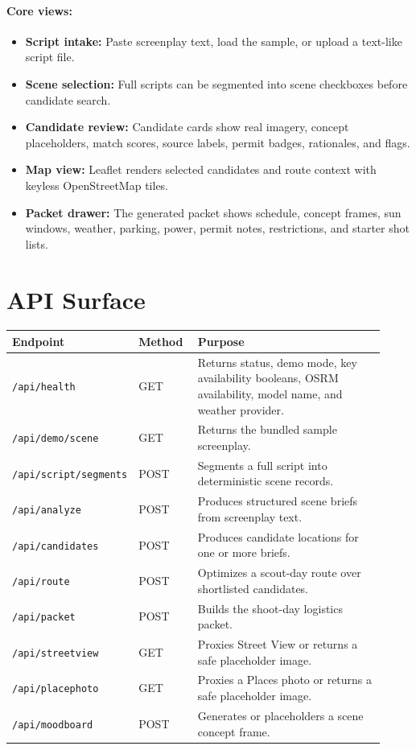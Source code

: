 \documentclass[11pt]{article}
\begin{document}
\paragraph{Core views:}
\begin{itemize}[leftmargin=*]
  \item \textbf{Script intake:} Paste screenplay text, load the sample, or upload
  a text-like script file.
  \item \textbf{Scene selection:} Full scripts can be segmented into scene
  checkboxes before candidate search.
  \item \textbf{Candidate review:} Candidate cards show real imagery, concept
  placeholders, match scores, source labels, permit badges, rationales, and
  flags.
  \item \textbf{Map view:} Leaflet renders selected candidates and route context
  with keyless OpenStreetMap tiles.
  \item \textbf{Packet drawer:} The generated packet shows schedule, concept
  frames, sun windows, weather, parking, power, permit notes, restrictions, and
  starter shot lists.
\end{itemize}

\section{API Surface}

\begin{longtable}{>{\raggedright\arraybackslash}p{0.22\linewidth} >{\raggedright\arraybackslash}p{0.16\linewidth} >{\raggedright\arraybackslash}p{0.54\linewidth}}
\toprule
\textbf{Endpoint} & \textbf{Method} & \textbf{Purpose} \\
\midrule
\endhead
\texttt{/api/health} & GET & Returns status, demo mode, key availability booleans, OSRM availability, model name, and weather provider. \\
\texttt{/api/demo/scene} & GET & Returns the bundled sample screenplay. \\
\texttt{/api/script/segments} & POST & Segments a full script into deterministic scene records. \\
\texttt{/api/analyze} & POST & Produces structured scene briefs from screenplay text. \\
\texttt{/api/candidates} & POST & Produces candidate locations for one or more briefs. \\
\texttt{/api/route} & POST & Optimizes a scout-day route over shortlisted candidates. \\
\texttt{/api/packet} & POST & Builds the shoot-day logistics packet. \\
\texttt{/api/streetview} & GET & Proxies Street View or returns a safe placeholder image. \\
\texttt{/api/placephoto} & GET & Proxies a Places photo or returns a safe placeholder image. \\
\texttt{/api/moodboard} & POST & Generates or placeholders a scene concept frame. \\
\bottomrule
\end{longtable}
\end{document}
